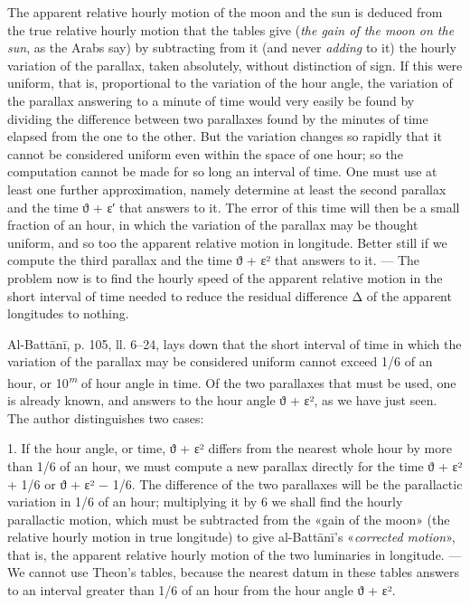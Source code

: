 \documentclass[11pt]{article}
\newcommand{\Pg}[1]{\marginpar{\footnotesize\color{gray}#1}}
\begin{document}
\par The apparent relative hourly motion of the moon and the sun is deduced from the true relative hourly motion that the tables give (\emph{the gain of the moon on the sun}, as the Arabs say) by subtracting from it (and never \emph{adding} to it) the hourly variation of the parallax, taken absolutely, without distinction of sign. If this were uniform, that is, proportional to the variation of the hour angle, the variation of the parallax answering to a minute of time would very easily be found by dividing the difference between two parallaxes found by the minutes of time elapsed from the one to the other. But the variation changes so rapidly that it cannot be considered uniform even within the space of one hour; so the computation cannot be made for so long an interval of time. One must use at least one further approximation, namely determine at least the second parallax and the time {\greekfont ϑ} + {\greekfont ε}′ that answers to it. The error of this time will then be a small fraction of an hour, in which the variation of the parallax may be thought uniform, and so too the apparent relative motion in longitude. Better still if we compute the third parallax and the time {\greekfont ϑ} + {\greekfont ε}² that answers to it. — The problem now is to find the hourly speed of the apparent relative motion in the short interval of time needed to reduce the residual difference {\greekfont Δ} of the apparent longitudes to nothing.\par
\par \Pg{I 279}Al-Battānī, p. 105, ll. 6–24, lays down that the short interval of time in which the variation of the parallax may be considered uniform cannot exceed 1/6 of an hour, or 10\textsuperscript{\itshape m} of hour angle in time. Of the two parallaxes that must be used, one is already known, and answers to the hour angle {\greekfont ϑ} + {\greekfont ε}², as we have just seen. The author distinguishes two cases:\par
\par 1. If the hour angle, or time, {\greekfont ϑ} + {\greekfont ε}² differs from the nearest whole hour by more than 1/6 of an hour, we must compute a new parallax directly for the time {\greekfont ϑ} + {\greekfont ε}² + 1/6 or {\greekfont ϑ} + {\greekfont ε}² − 1/6. The difference of the two parallaxes will be the parallactic variation in 1/6 of an hour; multiplying it by 6 we shall find the hourly parallactic motion, which must be subtracted from the «gain of the moon» (the relative hourly motion in true longitude) to give al-Battānī's «\emph{corrected motion}», that is, the apparent relative hourly motion of the two luminaries in longitude. — We cannot use Theon's tables, because the nearest datum in these tables answers to an interval greater than 1/6 of an hour from the hour angle {\greekfont ϑ} + {\greekfont ε}².\par
\end{document}

